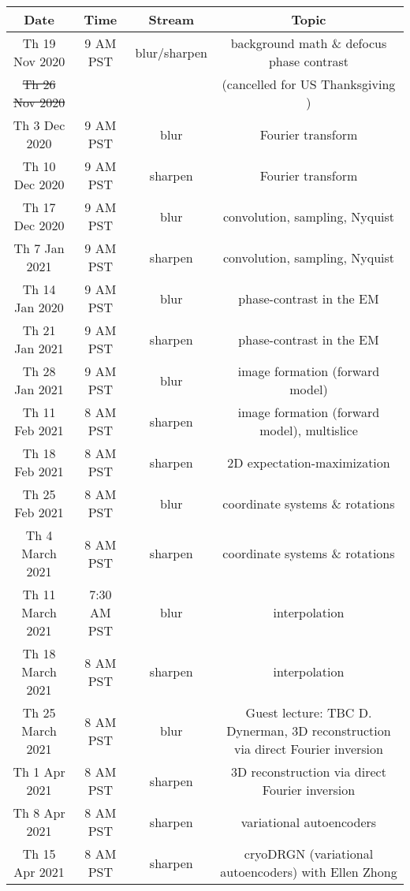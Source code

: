 \documentclass[11pt, oneside]{article}   	%
\begin{document}
\begin{center}
\small
 \begin{tabular}{|| c c c c||} 
 \hline
 Date & Time & Stream & Topic \\ [0.5ex] 
 \hline\hline
Th 19 Nov 2020 & \tiny{9 AM PST} &  blur/sharpen & background math \& defocus phase contrast  \\ 
 \hline
\sout{Th 26 Nov 2020}  &   & & (cancelled for US Thanksgiving )    \\ 
 \hline
Th 3 Dec 2020 & \tiny{9 AM PST} & blur & Fourier transform   \\ 
 \hline
Th 10 Dec 2020 & \tiny{9 AM PST} & sharpen & Fourier transform   \\ 
 \hline
Th 17 Dec 2020 & \tiny{9 AM PST} & blur & convolution, sampling, Nyquist   \\ 
 \hline
Th 7 Jan 2021 & \tiny{9 AM PST} & sharpen & convolution, sampling, Nyquist   \\ 
 \hline
Th 14 Jan 2020 & \tiny{9 AM PST} & blur & phase-contrast in the EM   \\ 
 \hline
Th 21 Jan 2021 & \tiny{9 AM PST} & sharpen & phase-contrast in the EM   \\ 
 \hline
Th 28 Jan 2021 & \tiny{9 AM PST} & blur & image formation (forward model)   \\ 
 \hline
Th 11 Feb 2021 & \tiny{8 AM PST} & sharpen & image formation (forward model), multislice   \\ 
 \hline
Th 18 Feb 2021 & \tiny{8 AM PST} & sharpen &  2D expectation-maximization \\ 
 \hline
Th 25 Feb 2021 & \tiny{8 AM PST} & blur & coordinate systems \& rotations  \\ 
 \hline
 Th 4 March 2021 & \tiny{8 AM PST} & sharpen & coordinate systems \& rotations  \\ 
 \hline
Th 11 March 2021 & \tiny{7:30 AM PST} & blur & interpolation  \\ 
 \hline
 Th 18 March 2021 & \tiny{8 AM PST} & sharpen & interpolation  \\ 
 \hline
Th 25 March 2021 & \tiny{8 AM PST} & blur & \tiny{Guest lecture: TBC D. Dynerman, 3D reconstruction via direct Fourier inversion}  \\ 
 \hline
Th 1 Apr 2021 & \tiny{8 AM PST} & sharpen & \tiny{3D reconstruction via direct Fourier inversion}  \\ 
 \hline
Th 8 Apr 2021 & \tiny{8 AM PST} & sharpen & variational autoencoders  \\ 
 \hline
Th 15 Apr 2021 & \tiny{8 AM PST} & sharpen & cryoDRGN (variational autoencoders) with Ellen Zhong  \\ 

\end{tabular}
\end{center}
\end{document}
